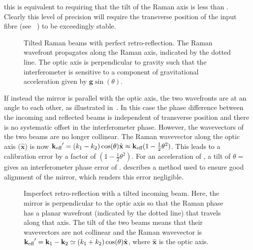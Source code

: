 this is equivalent to requiring that the tilt of the Raman axis is
less than . Clearly this level of
precision will require the transverse position of the input fibre 
(see ~) to be exceedingly
stable.
\begin{figure}[!htbp]
	\centering
  \fontsize{12pt}{12pt}
  \resizebox{0.5\textwidth}{!}{}
	\caption[Tilted Raman beams with perfect retro-reflection.]{Tilted
  Raman beams with perfect retro-reflection. The Raman wavefront
propagates along the Raman axis, indicated by the dotted line. The
optic axis is perpendicular to gravity such that the interferometer is
sensitive to a component of gravitational acceleration given by
$\textbf{g} \sin(\theta)$.}\label{fig:perfect_retro}
\end{figure}
\par\noindent
If instead the mirror is parallel with the optic axis, the two
wavefronts are at an angle to each other, as illustrated
in~. In this case the phase difference
between the incoming and reflected beams is independent of transverse
position and there is no systematic offset in the interferometer
phase. However, the wavevectors of the
two beams are no longer collinear. The Raman wavevector along the optic axis
($\hat{\textbf{x}}$)
is now ${\textbf k_\textnormal{eff}}' =
(k_1-k_2)\cos(\theta)\hat{\textbf{x}} \approx  {\textbf k_\textnormal{eff}} (1-\frac{1}{2}\theta^2)$. This leads to a
calibration error by a factor of $(1-\frac{1}{2}\theta^2)$. For an
acceleration of , a tilt
of $\theta = $  gives an interferometer
phase error of .  describes a method
used to ensure good alignment of the mirror, which
renders this error negligible.
\begin{figure}[htpb]
  \centering
  \fontsize{12pt}{12pt}
  \resizebox{0.5\textwidth}{!}{}
  \caption[Imperfect retro-reflection with a tilted incoming beam.
  ]{Imperfect retro-reflection with a tilted incoming beam.
  Here, the mirror is perpendicular to the optic axis so that the
Raman phase has a planar wavefront (indicated by the dotted line) that
travels along that axis. The tilt of the two beams means that their
wavevectors are not collinear and the Raman wavevector is ${\textbf k_\textnormal{eff}}' =
\textbf{k}_1 - \textbf{k}_2 \simeq
(k_1+k_2)\cos(\theta)\hat{\textbf{x}}$, where $\hat{\textbf{x}}$ is
the optic axis.}
  \label{fig:imperfect_retro}
\end{figure}
